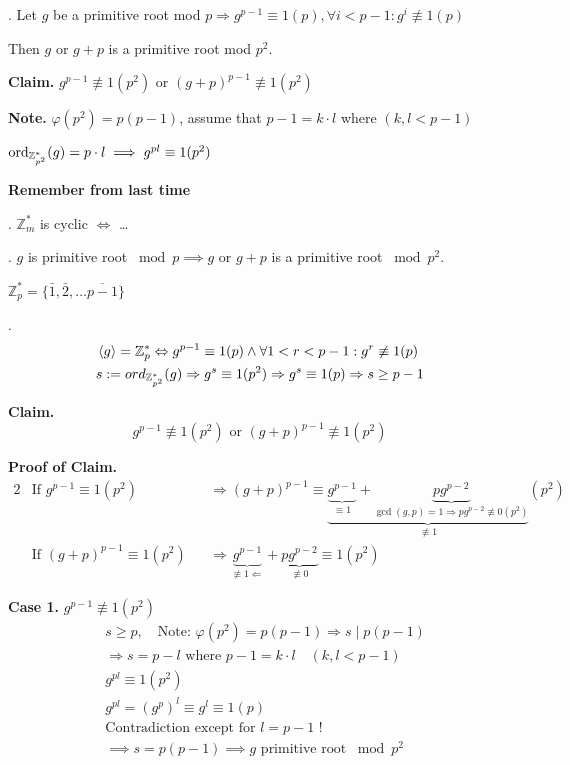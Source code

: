 \Proof.
Let $g$ be a primitive root mod $p \Rightarrow g^{p-1} \equiv 1 (p), \forall i < p-1 : g^i \not\equiv 1 (p) $

Then $g$ or $g+p$ is a primitive root mod $p^2$.

\textbf{Claim.}
$g^{p-1} \not\equiv 1 (p^2)$ or $(g+p)^{p-1} \not\equiv 1 (p^2)$

\textbf{Note.}
$\varphi(p^2) = p(p-1)$, assume that $p-1 = k \cdot l$ where $(k, l < p-1)$

$\operatorname{ord}_{\mathbb{Z}^{*}_{p^2}}(g) = p \cdot l \implies g^{pl} \equiv 1 (p^2)$

\textbf{Remember from last time}

\Theorem. $\mathbb{Z}_m^{*}$ is cyclic $\Leftrightarrow$ \dots

\Lemma. $g$ is primitive root $\bmod p \implies g$ or $g+p$ is a primitive root $\bmod{p^2}$.

\begin{leftbar}
  $\mathbb{Z}_p^{*} = \{\bar{1}, \bar{2}, \ldots \overline{p-1}\}$
\end{leftbar}
\Proof.
\begin{align*}
  &\left\langle g \right\rangle = \mathbb{Z}_p^{*} \Leftrightarrow g^{p-1} \equiv 1 (p) \land \forall 1 < r < p-1 : g^r \not\equiv 1(p) \\
  &s : = ord_{\mathbb{Z}_{p^2}^{*}} (g) \Rightarrow g^s \equiv 1 (p^2) \Rightarrow g^s \equiv 1 (p) \Rightarrow s \geq p-1
\end{align*}

\textbf{Claim.}
\[
  g^{p-1} \not\equiv 1 (p^2) \text{ or } (g+p)^{p-1} \not\equiv 1(p^2)
\]

\textbf{Proof of Claim.}
\begin{alignat*}{2}
  &\text{If } g^{p-1} \equiv 1(p^2)
  &&\Rightarrow (g+p)^{p-1} \equiv \underbrace{\underbrace{g^{p-1}}_{\equiv 1} + \underbrace{pg^{p-2}}_{\gcd(g,p) = 1 \Rightarrow pg^{p-2}\not\equiv 0 (p^2)}}_{\not\equiv 1} (p^2)\\
  &\text{If } (g+p)^{p-1} \equiv 1(p^2)
  &&\Rightarrow \underbrace{g^{p-1}}_{\not\equiv 1\Leftarrow} + \underbrace{pg^{p-2}}_{\not\equiv 0} \equiv 1 (p^2)
\end{alignat*}

\textbf{Case 1.} $g^{p-1} \not\equiv 1 (p^2)$
\begin{align*}
  &s \geq p, \quad\text{Note: } \varphi(p^2) = p(p-1) \Rightarrow s \mid p(p-1) \\
  &\Rightarrow s = p-l \text{ where } p-1 = k\cdot l \quad (k,l < p-1) \\
  &g^{pl} \equiv 1 (p^2) \\
  &g^{pl} = (g^p)^l \equiv g^l \equiv 1 (p) \\
  &\text{Contradiction except for } l = p-1 \text{ !}\\
  &\implies s = p(p-1) \implies g \text{ primitive root } \bmod p^2
\end{align*}

